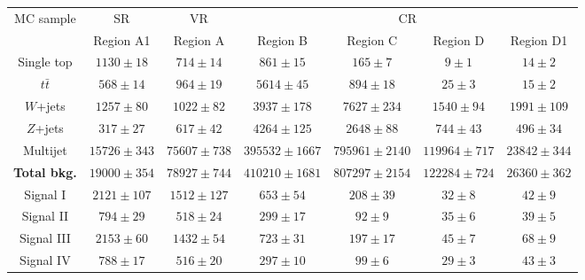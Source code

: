 \begin{table}
		\centering
		\begin{tabular}{ c | c | c | c | c | c | c } 
			\toprule
			MC sample & SR & VR & \multicolumn{4}{c}{CR} \\ \cline{2-7}
			& Region A1 & Region A & Region B & Region C & Region D & Region D1 \\
			\midrule
			Single top & $\num{1130}\pm\num{18}$ & $\num{714}\pm\num{14}$ & $\num{861}\pm\num{15}$ & $\num{165}\pm\num{7}$ & $\num{9}\pm\num{1}$ & $\num{14}\pm\num{2}$ \\
			$t\bar{t}$ & $\num{568}\pm\num{14}$ & $\num{964}\pm\num{19}$ & $\num{5614}\pm\num{45}$ & $\num{894}\pm\num{18}$ & $\num{25}\pm\num{3}$ & $\num{15}\pm\num{2}$ \\
			$W$+jets & $\num{1257}\pm\num{80}$ & $\num{1022}\pm\num{82}$ & $\num{3937}\pm\num{178}$ & $\num{7627}\pm\num{234}$ & $\num{1540}\pm\num{94}$ & $\num{1991}\pm\num{109}$ \\
			$Z$+jets & $\num{317}\pm\num{27}$ & $\num{617}\pm\num{42}$ & $\num{4264}\pm\num{125}$ & $\num{2648}\pm\num{88}$ & $\num{744}\pm\num{43}$ & $\num{496}\pm\num{34}$ \\
			Multijet & $\num{15726}\pm\num{343}$ & $\num{75607}\pm\num{738}$ & $\num{395532}\pm\num{1667}$ & $\num{795961}\pm\num{2140}$ & $\num{119964}\pm\num{717}$ & $\num{23842}\pm\num{344}$ \\
			\midrule
			\textbf{Total bkg.} & $\num{19000}\pm\num{354}$ & $\num{78927}\pm\num{744}$ & $\num{410210}\pm\num{1681}$ & $\num{807297}\pm\num{2154}$ & $\num{122284}\pm\num{724}$ & $\num{26360}\pm\num{362}$ \\
			\midrule
			Signal I & $\num{2121}\pm\num{107}$ & $\num{1512}\pm\num{127}$ & $\num{653}\pm\num{54}$ & $\num{208}\pm\num{39}$ & $\num{32}\pm\num{8}$ & $\num{42}\pm\num{9}$ \\
			Signal II & $\num{794}\pm\num{29}$ & $\num{518}\pm\num{24}$ & $\num{299}\pm\num{17}$ & $\num{92}\pm\num{9}$ & $\num{35}\pm\num{6}$ & $\num{39}\pm\num{5}$ \\
			Signal III & $\num{2153}\pm\num{60}$ & $\num{1432}\pm\num{54}$ & $\num{723}\pm\num{31}$ & $\num{197}\pm\num{17}$ & $\num{45}\pm\num{7}$ & $\num{68}\pm\num{9}$ \\
			Signal IV & $\num{788}\pm\num{17}$ & $\num{516}\pm\num{20}$ & $\num{297}\pm\num{10}$ & $\num{99}\pm\num{6}$ & $\num{29}\pm\num{3}$ & $\num{43}\pm\num{3}$ \\
			\bottomrule
		\end{tabular}

\end{table}
